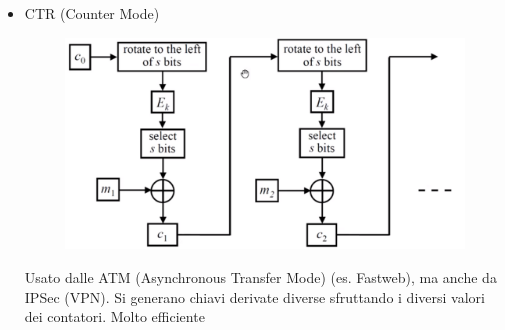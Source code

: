 \begin{itemize}
\begin{itemize}
\item CTR (Counter Mode)\\
\begin{figure}[h]
	\centering
	\includegraphics[width=0.5\linewidth]{immagini/img41}
\end{figure}
Usato dalle ATM (Asynchronous Transfer Mode) (es. Fastweb), ma anche da IPSec (VPN).
Si generano chiavi derivate diverse sfruttando i diversi valori dei contatori. Molto efficiente


\end{itemize}


	
\end{itemize}
